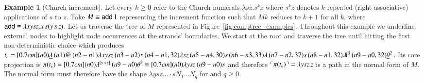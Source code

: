 \documentclass{elsarticle}
\theoremstyle{plain}
\theoremstyle{definition}
\newtheorem{example}{Example}[section]
\newcommand{\ghostlmd}{{\lambda\!\!\lambda}}
\newcommand{\ghostvar}{\theta}
\def\coresymbol{\pi} %
\newcommand{\core}[1]{\coresymbol(#1)} %
\newcommand{\alphaequiv}{\equiv}
\begin{document}
\begin{example}[Church increment]
\label{examp:churchincrement}
Let every $k\geq0$ refer to the Church numerals $\lambda s z . s^k z$
where $s^k z$ denotes $k$ repeated (right-associative) applications of $s$ to $z$.
Take $M \alphaequiv {\sf add}\, 1$ representing the increment function such that $M k$ reduces to $k+1$ for all $k$, where ${\sf add} \alphaequiv \lambda x y s z. x\, s (y\, s\, z)$.
Let us traverse the tree of $M$ represented in Figure~\ref{fig:comptree_examples}. Throughout this example we underline external nodes to highlight node occurrences at the strands' boundaries.
We start at the root and traverse the tree until hitting the first non-deterministic choice which produces
$t_\epsilon = \Pstr[0.7cm]{(n0){\underline\lambda }\,(n1){@}\,(n2-n1){\lambda x y s z}\,(n3-n2){x}\,(n4-n1,32){\lambda s z}\,(n5-n4,30){s}\,(n6-n3,33){\lambda }\,(n7-n2,37){s}\,(n8-n1,32){\ghostlmd^3}\,(n9-n0,32){\underline{\ghostvar}^2} }$. Its core projection is
$\core{t_\epsilon} = \Pstr[0.7cm]{(n0){\lambda^{[y\,s\,z]}} \, (n9-n0){{\ghostvar^2}} } \equiv
\Pstr[0.7cm]{(n0){\lambda y s z} \, (n9-n0){s} }$
and therefore $\pview{\core{t_\epsilon}} = \lambda y s z \, z$ is a path in the normal form of $M$.
The normal form must therefore have the shape $\lambda y s z \ldots \cdot s N_1 \ldots N_q$ for and $q\geq0$.


\end{example}
\end{document}
